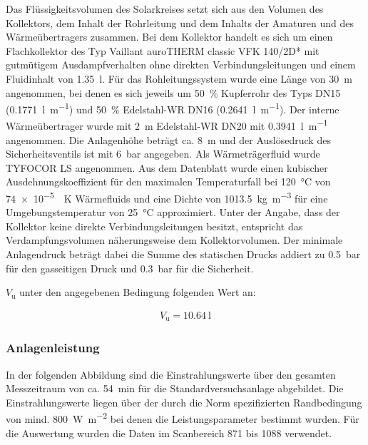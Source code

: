 Das Flüssigkeitsvolumen des Solarkreises setzt sich aus den Volumen des Kollektors, dem Inhalt der Rohrleitung und dem Inhalts der Amaturen und des Wärmeübertragers zusammen. Bei dem Kollektor handelt es sich um einen Flachkollektor des Typ Vaillant auroTHERM classic VFK 140/2D* mit gutmütigem Ausdampfverhalten ohne direkten Verbindungsleitungen und einem Fluidinhalt von \SI{1,35}{\litre}. Für das Rohleitungssystem wurde eine Länge von \SI{30}{\metre} angenommen, bei denen es sich jeweils um \SI{50}{\percent} Kupferrohr des Typs DN15 (\SI{0,1771}{\litre\per\metre}) und \SI{50}{\percent} Edelstahl-WR DN16 (\SI{0,2641}{\litre\per\metre}). Der interne Wärmeübertrager wurde mit \SI{2}{\metre} Edelstahl-WR DN20 mit \SI{0,3941}{\litre\per\metre} angenommen. Die Anlagenhöhe beträgt ca. \SI{8}{\metre} und der Auslösedruck des Sicherheitsventils ist mit \SI{6}{\bar} angegeben. Als Wärmeträgerfluid wurde TYFOCOR LS angenommen. Aus dem Datenblatt wurde einen kubischer Ausdehnungskoeffizient für den maximalen Temperaturfall bei \SI{120}{\celsius} von \SI{74e-5}{\per\kelvin} Wärmefluids und eine Dichte von \SI{1013,5}{\kg\per\metre\cubed} für eine Umgebungstemperatur von \SI{25}{\celsius} approximiert. Unter der Angabe, dass der Kollektor keine direkte Verbindungsleitungen besitzt, entspricht das Verdampfungsvolumen näherungsweise dem Kollektorvolumen. Der minimale Anlagendruck beträgt dabei die Summe des statischen Drucks addiert zu \SI{0,5}{\bar} für den gasseitigen Druck und \SI{0,3}{\bar} für die Sicherheit. 

$V_{\text{u}}$ unter den angegebenen Bedingung folgenden Wert an:

\begin{equation*}
	\label{MAG-Ber.}
	\begin{aligned}
	V_{\text{u}}=  \SI{10,64}{\litre}
	\end{aligned}
\end{equation*}

\subsubsection{Anlagenleistung}

In der folgenden Abbildung sind die Einstrahlungswerte über den gesamten Messzeitraum von ca. \SI{54}{\minute} für die Standardversuchsanlage abgebildet. 
Die Einstrahlungswerte liegen über der durch die Norm spezifizierten Randbedingung von mind. \SI{800}{\watt\per\meter\squared} bei denen die Leistungsparameter bestimmt wurden. Für die Auswertung wurden die Daten im Scanbereich 871 bis 1088 verwendet.

